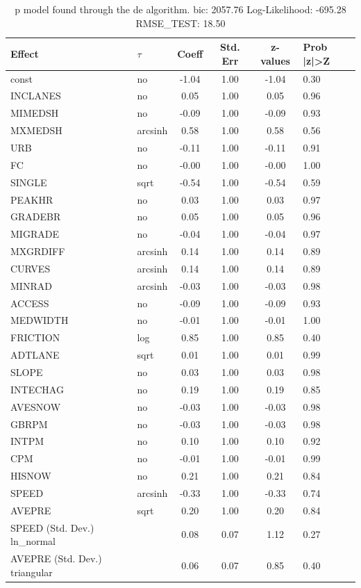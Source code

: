 \begin{table}
	\caption{p model found through the de algorithm. bic: 2057.76 Log-Likelihood: -695.28 RMSE_TEST: 18.50}
	\begin{center}
		\begin{tabular}{|l|l|c|c|c|l|}
			\hline
			Effect & $\tau$ & Coeff & Std. Err & z-values & Prob |z|>Z \\
			\hline
			const & no & -1.04 & 1.00 & -1.04 & 0.30 \\
			\hline
			INCLANES & no & 0.05 & 1.00 & 0.05 & 0.96 \\
			\hline
			MIMEDSH & no & -0.09 & 1.00 & -0.09 & 0.93 \\
			\hline
			MXMEDSH & arcsinh & 0.58 & 1.00 & 0.58 & 0.56 \\
			\hline
			URB & no & -0.11 & 1.00 & -0.11 & 0.91 \\
			\hline
			FC & no & -0.00 & 1.00 & -0.00 & 1.00 \\
			\hline
			SINGLE & sqrt & -0.54 & 1.00 & -0.54 & 0.59 \\
			\hline
			PEAKHR & no & 0.03 & 1.00 & 0.03 & 0.97 \\
			\hline
			GRADEBR & no & 0.05 & 1.00 & 0.05 & 0.96 \\
			\hline
			MIGRADE & no & -0.04 & 1.00 & -0.04 & 0.97 \\
			\hline
			MXGRDIFF & arcsinh & 0.14 & 1.00 & 0.14 & 0.89 \\
			\hline
			CURVES & arcsinh & 0.14 & 1.00 & 0.14 & 0.89 \\
			\hline
			MINRAD & arcsinh & -0.03 & 1.00 & -0.03 & 0.98 \\
			\hline
			ACCESS & no & -0.09 & 1.00 & -0.09 & 0.93 \\
			\hline
			MEDWIDTH & no & -0.01 & 1.00 & -0.01 & 1.00 \\
			\hline
			FRICTION & log & 0.85 & 1.00 & 0.85 & 0.40 \\
			\hline
			ADTLANE & sqrt & 0.01 & 1.00 & 0.01 & 0.99 \\
			\hline
			SLOPE & no & 0.03 & 1.00 & 0.03 & 0.98 \\
			\hline
			INTECHAG & no & 0.19 & 1.00 & 0.19 & 0.85 \\
			\hline
			AVESNOW & no & -0.03 & 1.00 & -0.03 & 0.98 \\
			\hline
			GBRPM & no & -0.03 & 1.00 & -0.03 & 0.98 \\
			\hline
			INTPM & no & 0.10 & 1.00 & 0.10 & 0.92 \\
			\hline
			CPM & no & -0.01 & 1.00 & -0.01 & 0.99 \\
			\hline
			HISNOW & no & 0.21 & 1.00 & 0.21 & 0.84 \\
			\hline
			SPEED & arcsinh & -0.33 & 1.00 & -0.33 & 0.74 \\
			\hline
			AVEPRE & sqrt & 0.20 & 1.00 & 0.20 & 0.84 \\
			\hline
			SPEED (Std. Dev.) ln_normal &  & 0.08 & 0.07 & 1.12 & 0.27 \\
			\hline
			AVEPRE (Std. Dev.) triangular &  & 0.06 & 0.07 & 0.85 & 0.40 \\
			\hline
		\end{tabular}
	\end{center}
\end{table}
